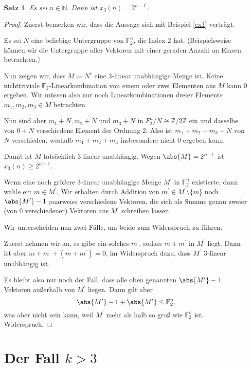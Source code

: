 \documentclass[a4paper]{scrartcl}
\theoremstyle{break}
\newtheorem{theorem}{Satz}
\newcommand{\N}{\mathbb{N}}
\newcommand{\Z}{\mathbb{Z}}
\newcommand{\F}{\mathbb{F}}
\begin{document}
\begin{theorem}
  Es sei $n \in \N$. Dann ist $x_3(n) = 2^{n-1}$.
\end{theorem}
\begin{proof}
  Zuerst bemerken wir, dass die Aussage sich mit Beispiel \ref{ex1} verträgt.

  Es sei $N$ eine beliebige Untergruppe von $\F_2^n$, die Index $2$ hat.
  (Beispielsweise können wir die Untergruppe aller Vektoren mit einer geraden Anzahl an Einsen betrachten.)

  Nun zeigen wir, dass $M \coloneqq N^c$ eine $3$-linear unabhängige Menge ist.
  Keine nichttriviale $\F_2$-Linearkombination von einem oder zwei Elementen aus $M$ kann $0$ ergeben.
  Wir müssen also nur noch Linearkombinationen dreier Elemente $m_1, m_2, m_3 \in M$ betrachten.

  Nun sind aber $m_1 + N, m_2 + N$ und $m_3 + N$ in $F_2^n / N \cong \Z / 2\Z$ ein und dasselbe von $0 + N$ verschiedene Element der Ordnung 2.
  Also ist $m_1 + m_2 + m_3 + N$ von $N$ verschieden, weshalb $m_1 + m_2 + m_3$ insbesondere nicht $0$ ergeben kann.

  Damit ist $M$ tatsächlich $3$-linear unabhängig. Wegen $\abs{M} = 2^{n-1}$ ist $x_3(n) \ge 2^{n-1}$.

  Wenn eine noch größere $3$-linear unabhängige Menge $M^\prime$ in $\F_2^n$ existierte,
  dann wähle ein $m \in M^\prime$. Wir erhalten durch Addition von $m^\prime \in M^\prime \setminus \{m\}$
  noch $\abs{M^\prime} - 1$ paarweise verschiedene Vektoren,
  die sich als Summe genau zweier (von $0$ verschiedener) Vektoren aus $M^\prime$ schreiben lassen.

  Wir unterscheiden nun zwei Fälle, um beide zum Widerspruch zu führen.

  Zuerst nehmen wir an, es gäbe ein solches $m^\prime$, sodass $m + m^\prime$ in $M^\prime$ liegt.
  Dann ist aber $m + m^\prime + (m + m^\prime) = 0$, im Widerspruch dazu, dass $M^\prime$
  $3$-linear unabhängig ist.

  Es bleibt also nur noch der Fall, dass alle oben genannten $\abs{M^\prime} - 1$ Vektoren
  außerhalb von $M^\prime$ liegen. Dann gilt aber
  \[
    \abs{M^\prime} - 1 + \abs{M^\prime} \le \F_2^n,
  \]
  was aber nicht sein kann, weil $M^\prime$ mehr als halb so groß wie $\F_2^n$ ist.
  Widerspruch.
\end{proof}

\section{Der Fall $k > 3$}
\end{document}
